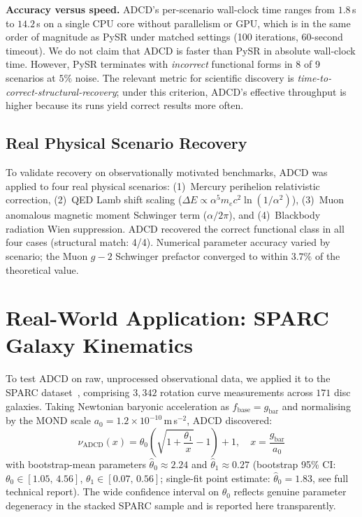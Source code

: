 \documentclass{article}
\begin{document}
\textbf{Accuracy versus speed.} ADCD's per-scenario wall-clock time ranges from $1.8$\,s to $14.2$\,s on a single CPU core without parallelism or GPU, which is in the same order of magnitude as PySR under matched settings (100 iterations, 60-second timeout). We do not claim that ADCD is faster than PySR in absolute wall-clock time. However, PySR terminates with \emph{incorrect} functional forms in 8 of 9 scenarios at $5\%$ noise. The relevant metric for scientific discovery is \emph{time-to-correct-structural-recovery}; under this criterion, ADCD's effective throughput is higher because its runs yield correct results more often.

\subsection{Real Physical Scenario Recovery}
To validate recovery on observationally motivated benchmarks, ADCD was applied to four real physical scenarios: (1)~Mercury perihelion relativistic correction, (2)~QED Lamb shift scaling ($\Delta E \propto \alpha^5 m_e c^2 \ln(1/\alpha^2)$), (3)~Muon anomalous magnetic moment Schwinger term ($\alpha/2\pi$), and (4)~Blackbody radiation Wien suppression. ADCD recovered the correct functional class in all four cases (structural match: 4/4). Numerical parameter accuracy varied by scenario; the Muon $g{-}2$ Schwinger prefactor converged to within $3.7\%$ of the theoretical value.

\section{Real-World Application: SPARC Galaxy Kinematics}
\label{sec:sparc}

To test ADCD on raw, unprocessed observational data, we applied it to the SPARC dataset~\cite{lelli2016sparc}, comprising $3{,}342$ rotation curve measurements across $171$ disc galaxies. Taking Newtonian baryonic acceleration as $f_{\text{base}} = g_{\text{bar}}$ and normalising by the MOND scale $a_0 = 1.2\times10^{-10}$\,m\,s$^{-2}$, ADCD discovered:
\begin{equation}
\nu_{\text{ADCD}}(x) = \theta_0\!\left(\sqrt{1 + \frac{\theta_1}{x}} - 1\right) + 1, \quad x = \frac{g_{\text{bar}}}{a_0}
\label{eq:nu_adcd}
\end{equation}
with bootstrap-mean parameters $\hat{\theta}_0 \approx 2.24$ and $\hat{\theta}_1 \approx 0.27$ (bootstrap 95\% CI: $\theta_0 \in [1.05,\,4.56]$, $\theta_1 \in [0.07,\,0.56]$; single-fit point estimate: $\hat{\theta}_0 = 1.83$, see full technical report). The wide confidence interval on $\theta_0$ reflects genuine parameter degeneracy in the stacked SPARC sample and is reported here transparently.
\end{document}
